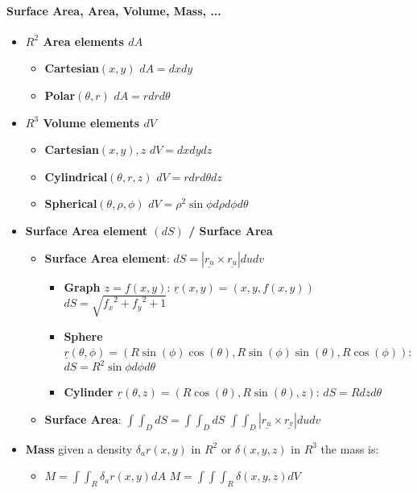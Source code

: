 \documentclass[8pt, twocolumn]{article}
\begin{document}
\paragraph{Surface Area, Area, Volume, Mass, ...}
\begin{itemize}
	\item \textbf{$R^2$ Area elements $d{A}$}
		\begin{itemize}
			\item \textbf{Cartesian$(x, y)$} $dA = dx dy$
			\item \textbf{Polar$(\theta, r)$} $dA = r dr d\theta$
		\end{itemize}
	\item \textbf{$R^3$ Volume elements $d{V}$}
		\begin{itemize}
			\item \textbf{Cartesian$(x, y), z$} $dV = dx dy dz$
			\item \textbf{Cylindrical$(\theta, r, z)$} $dV = r dr d\theta dz$			
			\item \textbf{Spherical$(\theta, \rho, \phi)$} $dV = \rho^2 \sin{\phi} d\rho d\phi d\theta$
		\end{itemize}	
	\item \textbf{Surface Area element $(dS)$ / Surface Area}
		\begin{itemize}

			\item \textbf{Surface Area element}: $dS = |\underline{r_u} \times \underline{r_u}| du dv$
				\begin{itemize}
					\item \textbf{Graph $z = f(x, y)$}: $\underline{r}(x, y) = (x, y, f(x, y))$ $dS = \sqrt{{f_x}^2 + {f_y}^2 + 1} $
					\item \textbf{Sphere $\underline{r}(\theta, \phi) = (R\sin(\phi)\cos(\theta), R\sin(\phi)\sin(\theta), R\cos(\phi))$}: $dS = R^2\sin{\phi}d\phi d\theta$
					\item \textbf{Cylinder $\underline{r}(\theta, z) = (R\cos(\theta), R\sin(\theta),z)$}: $dS = Rdz d\theta$
				\end{itemize}
			\item \textbf{Surface Area}: $\int\int_D{dS} = \int\int_D{dS}$  $\int\int_D{|\underline{r_u} \times \underline{r_v}| du dv} $
		\end{itemize}
	\item \textbf{Mass} given a density $\delta_ar(x, y)$ in  $R^2$ or $\delta(x, y, z)$ in $R^3$  the mass is: 
		\begin{itemize}
			\item $M = \int\int_R{\delta_ar(x, y)dA}$ $M = \int\int\int_R{\delta(x, y, z)dV}$
		\end{itemize}

\end{itemize}
\end{document}
